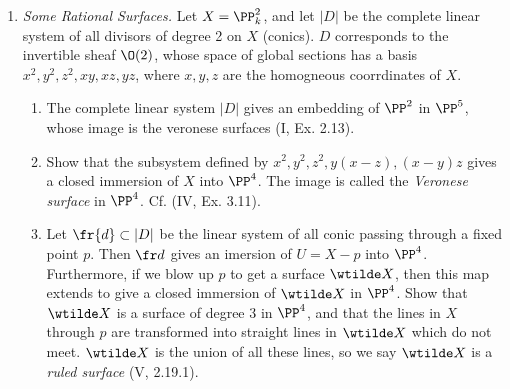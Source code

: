 \documentclass[12pt]{amsart}
\begin{document}
\begin{enumerate}
  \item[7.7.] {
      \emph{Some Rational Surfaces.}
      Let $X=\PP^2_k$, and let $|D|$ be the complete linear system of all divisors of degree 2 on $X$ (conics).
      $D$ corresponds to the invertible sheaf $\O(2)$, whose space of global sections has a basis $x^2,y^2,z^2,xy,xz,yz$, where $x,y,z$ are the homogneous coorrdinates of $X$.
      \begin{enumerate}
        \item The complete linear system $|D|$ gives an embedding of $\PP^2$ in $\PP^5$, whose image is the veronese surfaces (I, Ex. 2.13).
        \item Show that the subsystem defined by $x^2,y^2,z^2,y(x-z),(x-y)z$ gives a closed immersion of $X$ into $\PP^4$.
          The image is called the \emph{Veronese surface} in $\PP^4$. Cf. (IV, Ex. 3.11).
        \item Let $\fr{d}\subset |D|$ be the linear system of all conic passing through a fixed point $p$.
          Then $\fr d$ gives an imersion of $U=X-p$ into $\PP^4$.
          Furthermore, if we blow up $p$ to get a surface $\wtilde X$, then this map extends to give a closed immersion of $\wtilde X$ in $\PP^4$.
          Show that $\wtilde X$ is a surface of degree 3 in $\PP^4$, and that the lines in $X$ through $p$ are transformed into straight lines in $\wtilde X$ which do not meet.
          $\wtilde X$ is the union of all these lines, so we say $\wtilde X$ is a \emph{ruled surface} (V, 2.19.1).
      \end{enumerate}
    }
\end{enumerate}
\end{document}
